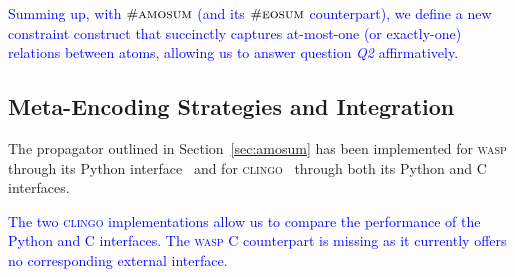\documentclass[preprint,authoryear]{elsarticle}
\theoremstyle{definition}
\def\amosum{\ensuremath{\textsc{amosum}}\xspace}
\begin{document}

\textcolor{blue}{Summing up, with $\#\amosum$ (and its $\#\textsc{eosum}$ counterpart), we define a new constraint construct that succinctly captures at-most-one (or exactly-one) relations between atoms, allowing us to answer question \emph{Q2} affirmatively.}

\subsection{Meta-Encoding Strategies and Integration}

The propagator outlined in Section~\ref{sec:amosum} has been implemented for \textsc{wasp} through its Python interface~\citep{DBLP:journals/tplp/DodaroR20} and for \textsc{clingo}~\citep{DBLP:conf/iclp/GebserKKOSW16} through both its Python and C interfaces.

\textcolor{blue}{The two \textsc{clingo} implementations allow us to compare the performance of the Python and C interfaces. The \textsc{wasp} C counterpart is missing as it currently offers no corresponding external interface.}
\end{document}
